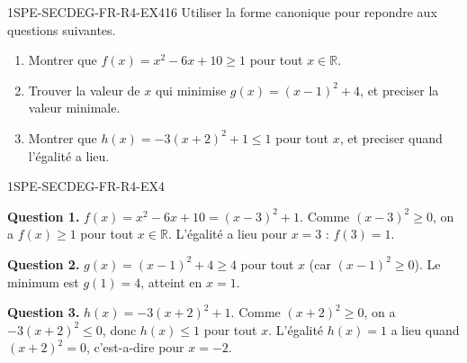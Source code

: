 
\begin{exercice}{1SPE-SECDEG-FR-R4-EX4}{1}{6}
Utiliser la forme canonique pour repondre aux questions suivantes.
\begin{enumerate}
  \item Montrer que $f(x) = x^2 - 6x + 10 \geq 1$ pour tout $x \in \mathbb{R}$.
  \item Trouver la valeur de $x$ qui minimise $g(x) = (x-1)^2 + 4$, et preciser la valeur minimale.
  \item Montrer que $h(x) = -3(x+2)^2 + 1 \leq 1$ pour tout $x$, et preciser quand l'égalité a lieu.
\end{enumerate}
\end{exercice}


\begin{corrige}{1SPE-SECDEG-FR-R4-EX4}

\textbf{Question 1.} $f(x) = x^2 - 6x + 10 = (x-3)^2 + 1$. Comme $(x-3)^2 \geq 0$, on a $f(x) \geq 1$ pour tout $x \in \mathbb{R}$. L'égalité a lieu pour $x = 3$ : $f(3) = 1$.

\textbf{Question 2.} $g(x) = (x-1)^2 + 4 \geq 4$ pour tout $x$ (car $(x-1)^2 \geq 0$). Le minimum est $g(1) = 4$, atteint en $x = 1$.

\textbf{Question 3.} $h(x) = -3(x+2)^2 + 1$. Comme $(x+2)^2 \geq 0$, on a $-3(x+2)^2 \leq 0$, donc $h(x) \leq 1$ pour tout $x$. L'égalité $h(x) = 1$ a lieu quand $(x+2)^2 = 0$, c'est-a-dire pour $x = -2$.

\end{corrige}

